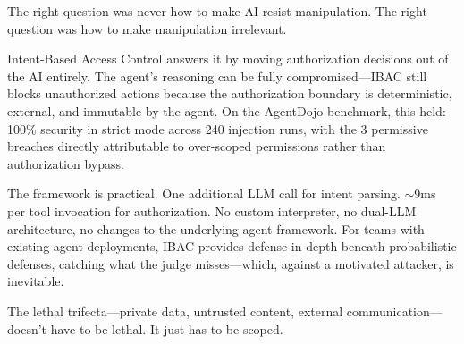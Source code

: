 \documentclass[11pt]{article}
\begin{document}
The right question was never how to make AI resist manipulation. The right question was how to make manipulation irrelevant.

Intent-Based Access Control answers it by moving authorization decisions out of the AI entirely. The agent's reasoning can be fully compromised---IBAC still blocks unauthorized actions because the authorization boundary is deterministic, external, and immutable by the agent. On the AgentDojo benchmark, this held: 100\% security in strict mode across 240 injection runs, with the 3 permissive breaches directly attributable to over-scoped permissions rather than authorization bypass.

The framework is practical. One additional LLM call for intent parsing. ${\sim}$9ms per tool invocation for authorization. No custom interpreter, no dual-LLM architecture, no changes to the underlying agent framework. For teams with existing agent deployments, IBAC provides defense-in-depth beneath probabilistic defenses, catching what the judge misses---which, against a motivated attacker, is inevitable.

The lethal trifecta---private data, untrusted content, external communication---doesn't have to be lethal. It just has to be scoped.
\end{document}

